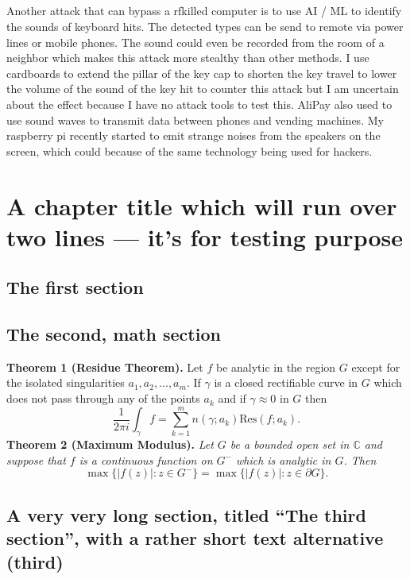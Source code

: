 \documentclass[mscthesis]{usiinfthesis}
\begin{document}
\paragraph{}
Another attack that can bypass a rfkilled computer is to use AI / ML to identify the sounds of keyboard hits. The detected types can be send to remote via power lines or mobile phones. The sound could even be recorded from the room of a neighbor which makes this attack more stealthy than other methods. I use cardboards to extend the pillar of the key cap to shorten the key travel to lower the volume of the sound of the key hit to counter this attack but I am uncertain about the effect because I have no attack tools to test this. AliPay also used to use sound waves to transmit data between phones and vending machines. My raspberry pi recently started to emit strange noises from the speakers on the screen, which could because of the same technology being used for hackers.

\chapter[Short title]{A chapter title which will run over two lines --- it's for
  testing purpose}

\section{The first section}

\section{The second, math section}

\textbf{Theorem 1 (Residue Theorem).}
Let $f$ be analytic in the region $G$ except for the isolated singularities $a_1,a_2,\ldots,a_m$. If $\gamma$ is a closed rectifiable curve in $G$ which does not pass through any of the points $a_k$ and if $\gamma\approx 0$ in $G$ then
\[
  \frac{1}{2\pi i}\int_\gamma f = \sum_{k=1}^m n(\gamma;a_k) \text{Res}(f;a_k).
\]
\textbf{Theorem 2 (Maximum Modulus).}
\emph{Let $G$ be a bounded open set in $\mathbb{C}$ and suppose that $f$ is a continuous function on $G^-$ which is analytic in $G$. Then}
\[
  \max\{|f(z)|:z\in G^-\}=\max \{|f(z)|:z\in \partial G \}.
\]

\section[third]{A very very long section, titled ``The third section'', with
  a rather  short text alternative (third)}
\end{document}
